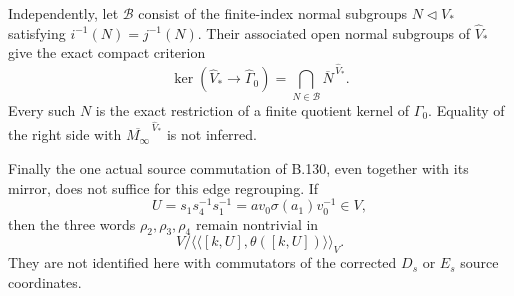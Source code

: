 Independently, let $\mathcal B$ consist of the finite-index normal
subgroups $N\triangleleft V_*$ satisfying $i^{-1}(N)=j^{-1}(N)$.
Their associated open normal subgroups of $\widehat V_*$ give
the exact compact criterion
\begin{equation}\label{eq:B134-compact-base-kernel}
 \ker(\widehat V_*\longrightarrow\widehat\Gamma_0)
      =\bigcap_{N\in\mathcal B}\overline N^{\,\widehat V_*}.
\end{equation}
Every such $N$ is the exact restriction of a finite quotient kernel
of $\Gamma_0$. Equality of the right side with
$\overline{M_\infty}^{\,\widehat V_*}$ is not inferred.

Finally the one actual source commutation of B.130, even together
with its mirror, does not suffice for this edge regrouping. If
\begin{equation}\label{eq:B134-known-U}
 U=s_1s_4^{-1}s_1^{-1}
      =a v_0\sigma(a_1)v_0^{-1}\in V,
\end{equation}
then the three words $\rho_2,\rho_3,\rho_4$ remain nontrivial in
\begin{equation}\label{eq:B134-one-source-repair}
 V/\langle\!\langle[k,U],\theta([k,U])\rangle\!\rangle_V.
\end{equation}
They are not identified here with commutators of the corrected
$D_s$ or $E_s$ source coordinates.

